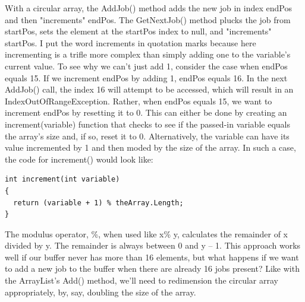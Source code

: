 \documentclass[12pt,a4paper,final,twoside,titlepage]{book}
\begin{document}
With a circular array, the AddJob() method adds the new job in index endPos and then "increments" endPos. The GetNextJob() method plucks the job from startPos, sets the element at the startPos index to null, and "increments" startPos. I put the word increments in quotation marks because here incrementing is a trifle more complex than simply adding one to the variable's current value. To see why we can't just add 1, consider the case when endPos equals 15. If we increment endPos by adding 1, endPos equals 16. In the next AddJob() call, the index 16 will attempt to be accessed, which will result in an IndexOutOfRangeException. Rather, when endPos equals 15, we want to increment endPos by resetting it to 0. This can either be done by creating an increment(variable) function that checks to see if the passed-in variable equals the array's size and, if so, reset it to 0. Alternatively, the variable can have its value incremented by 1 and then moded by the size of the array. In such a case, the code for increment() would look like:
\begin{lstlisting}
int increment(int variable)
{
  return (variable + 1) % theArray.Length;
}
\end{lstlisting}
The modulus operator, \%, when used like x\% y, calculates the remainder of x divided by y. The remainder is always between 0 and y – 1. This approach works well if our buffer never has more than 16 elements, but what happens if we want to add a new job to the buffer when there are already 16 jobs present? Like with the ArrayList's Add() method, we'll need to redimension the circular array appropriately, by, say, doubling the size of the array.
\end{document}
